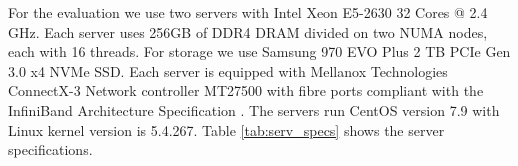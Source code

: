 For the evaluation we use two servers with Intel Xeon E5-2630 32 Cores @ 2.4
GHz. Each server uses 256GB of DDR4 DRAM divided on two NUMA nodes, each with 16
threads. For storage we use Samsung 970 EVO Plus 2 TB PCIe Gen 3.0 x4 NVMe SSD.
Each server is equipped with Mellanox Technologies ConnectX-3 Network controller
MT27500 with fibre ports compliant with the InfiniBand Architecture
Specification . The servers run CentOS version 7.9 with Linux kernel version is
5.4.267. Table \ref{tab:serv_specs} shows the server specifications.
\begin{table}[H]
\caption{Server specifications table.}
\label{tab:serv_specs}
\end{table}


